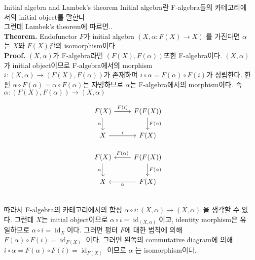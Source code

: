 \documentclass[t]{beamer}
\begin{document}
\begin{frame}[fragile]{Initial algebra and Lambek's theorem}
  Initial algebra란 F-algebra들의 카테고리에서의 initial object를 말한다\newline\\
  \pause
  그런데 Lambek's theorem에 따르면..\\
  \scriptsize
  \textbf{Theorem.} Endofunctor \(F\)가 initial algebra \((X, \alpha : F(X) \to X)\) 를 가진다면 \(\alpha\)는 \(X\)와 \(F(X)\)간의 isomorphism이다\\
  \pause
  \textbf{Proof.} \((X, \alpha)\)가 F-algebra라면 \((F(X), F(\alpha))\)또한 F-algebra이다.
    \((X, \alpha)\)가 initial object이므로 F-algebra에서의 morphism \(i : (X,\alpha) \to (F(X), F(\alpha)) \)가 존재하며 \(i \circ \alpha = F(\alpha) \circ F(i) \)가 성립한다.
    한편 \( \alpha \circ F(\alpha) = \alpha \circ F(\alpha) \)는 자명하므로 \(\alpha\)는 F-algebra에서의 morphism이다.
    즉 \( \alpha : (F(X),F(\alpha)) \to (X,\alpha)\)

  \begin{minipage}{.5\textwidth}
    \[
      \begin{tikzcd}
        F(X) \arrow{r}{F(i)} \arrow[swap]{d}{\alpha} & F(F(X)) \arrow{d}{F(\alpha)} \\%
        X \arrow{r}{i} & F(X)
      \end{tikzcd}
    \]
  \end{minipage}
  \begin{minipage}{.45\textwidth}
    \[
      \begin{tikzcd}
        F(X) \arrow[swap]{d}{\alpha} & F(F(X)) \arrow[swap]{l}{F(\alpha)} \arrow{d}{F(\alpha)} \\%
        X & F(X) \arrow{l}{\alpha}
      \end{tikzcd}
    \]
  \end{minipage}
  \vspace{.5cm}
  \\따라서 F-algebra의 카테고리에서의 합성 \(\alpha \circ i : (X,\alpha) \to (X,\alpha)\) 을 생각할 수 있다.
  그런데 \(X\)는 initial object이므로 \(\alpha \circ i = \operatorname{id}_{(X,\alpha)} \)이고,
  identity morphism은 유일하므로 \(\alpha \circ i = \operatorname{id}_X \)이다.
  그러면 펑터 \(F\)에 대한 법칙에 의해\( F(\alpha) \circ F(i) = \operatorname{id}_{F(X)} \) 이다.
  그러면 왼쪽의 commutative diagram에 의해 \( i \circ \alpha = F(\alpha) \circ F(i) = \operatorname{id}_{F(X)}  \) 이므로 \(\alpha\) 는 isomorphism이다.

\end{frame}
\end{document}

